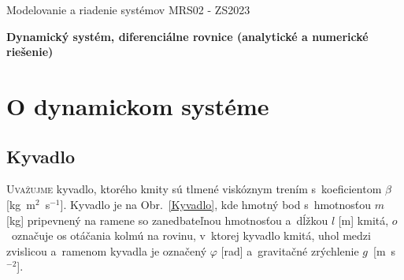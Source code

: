 \documentclass[a4paper, 10pt, ]{article}
\def\oznacenieCasti{MRS02 - ZS2023}
\begin{document}
\lstset{%
style=mystyle,
rangebeginprefix=\#\#\#\ cellB\ ,%
rangebeginsuffix=\ \#\#\#,%
rangeendprefix=\#\#\#\ cellE\ ,%
rangeendsuffix=\ \#\#\#,%
includerangemarker=false,
}




\fontsize{12pt}{22pt}\selectfont

\centerline{\textsf{Modelovanie a riadenie systémov} \hfill \textsf{\oznacenieCasti}}

\fontsize{18pt}{22pt}\selectfont







\begin{flushleft}
	\textbf{\textsf{Dynamický systém, diferenciálne rovnice (analytické a numerické riešenie)}}
\end{flushleft}





\normalsize

\bigskip

{\hypersetup{hidelinks}

\tableofcontents

}

\bigskip

\vspace{18pt}









\section{O dynamickom systéme}



\subsection{Kyvadlo}
\label{castKyvadlo}



\lettrine[lines=3, nindent=0pt]{U}{važujme} kyvadlo, ktorého kmity sú tlmené viskóznym trením s~koeficientom $\beta$ [kg~m$^2$~s$^{-1}$]. Kyvadlo je na Obr.~\ref{Kyvadlo}, kde hmotný bod s~hmotnosťou $m$ [kg] pripevnený na ramene so zanedbateľnou hmotnosťou a~dĺžkou $l$ [m] kmitá, $o$~označuje os otáčania kolmú na rovinu, v~ktorej kyvadlo kmitá, uhol medzi zvislicou a~ramenom kyvadla je označený $\varphi$ [rad] a~gravitačné zrýchlenie $g$~[m~s$^{-2}$].
\end{document}
